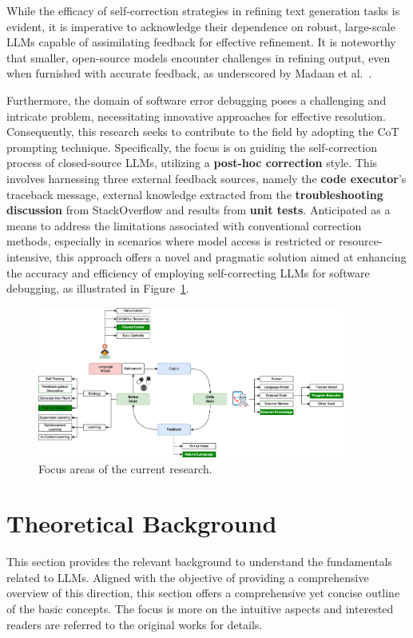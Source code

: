 \documentclass[a4paper,oneside]{book}
\begin{document}
While the efficacy of self-correction strategies in refining text generation tasks is evident, it is imperative to acknowledge their dependence on robust, large-scale LLMs capable of assimilating feedback for effective refinement. It is noteworthy that smaller, open-source models encounter challenges in refining output, even when furnished with accurate feedback, as underscored by Madaan et al.~\cite{madaan2024self}.

Furthermore, the domain of software error debugging poses a challenging and intricate problem, necessitating innovative approaches for effective resolution. Consequently, this research seeks to contribute to the field by adopting the CoT prompting technique. Specifically, the focus is on guiding the self-correction process of closed-source LLMs, utilizing a \textbf{post-hoc correction} style. This involves harnessing three external feedback sources, namely the \textbf{code executor}'s traceback message, external knowledge extracted from the \textbf{troubleshooting discussion} from StackOverflow and results from \textbf{unit tests}. Anticipated as a means to address the limitations associated with conventional correction methods, especially in scenarios where model access is restricted or resource-intensive, this approach offers a novel and pragmatic solution aimed at enhancing the accuracy and efficiency of employing self-correcting LLMs for software debugging, as illustrated in Figure~\ref{fig:direction_of_research}.

\begin{figure}[!htb]
  \centering
  \includegraphics[width=0.90\textwidth]{img/direction_of_research}
  \caption{Focus areas of the current research.}\label{fig:direction_of_research}
\end{figure}

\chapter{Theoretical Background}
This section provides the relevant background to understand the fundamentals related to LLMs. Aligned with the objective of providing a comprehensive overview of this direction, this section offers a comprehensive yet concise outline of the basic concepts. The focus is more on the intuitive aspects and interested readers are referred to the original works for details.
\end{document}
